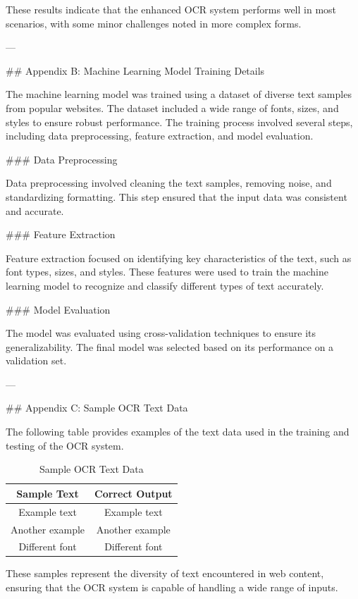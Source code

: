 These results indicate that the enhanced OCR system performs well in most scenarios, with some minor challenges noted in more complex forms.

---

## Appendix B: Machine Learning Model Training Details

The machine learning model was trained using a dataset of diverse text samples from popular websites. The dataset included a wide range of fonts, sizes, and styles to ensure robust performance. The training process involved several steps, including data preprocessing, feature extraction, and model evaluation.

### Data Preprocessing

Data preprocessing involved cleaning the text samples, removing noise, and standardizing formatting. This step ensured that the input data was consistent and accurate.

### Feature Extraction

Feature extraction focused on identifying key characteristics of the text, such as font types, sizes, and styles. These features were used to train the machine learning model to recognize and classify different types of text accurately.

### Model Evaluation

The model was evaluated using cross-validation techniques to ensure its generalizability. The final model was selected based on its performance on a validation set.

---

## Appendix C: Sample OCR Text Data

The following table provides examples of the text data used in the training and testing of the OCR system.

\begin{table}[ht]
\centering
\begin{tabular}{|c|c|}
\hline
\textbf{Sample Text} & \textbf{Correct Output} \\
\hline
Example text & Example text \\
\hline
Another example & Another example \\
\hline
Different font & Different font \\
\hline
\end{tabular}
\caption{Sample OCR Text Data}
\label{tab:text_data}
\end{table}

These samples represent the diversity of text encountered in web content, ensuring that the OCR system is capable of handling a wide range of inputs.

